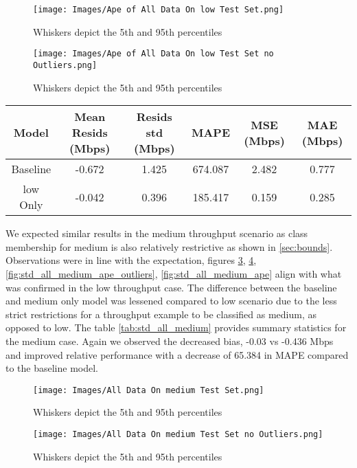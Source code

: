 \begin{figure}[h]
\texttt{[image: Images/Ape of All Data On low Test Set.png]}
\centering
\caption{Whiskers depict the 5th and 95th percentiles}
\label{fig:std_all_low_ape_outliers}
\end{figure}

\begin{figure}[h]
\texttt{[image: Images/Ape of All Data On low Test Set no Outliers.png]}
\centering
\caption{Whiskers depict the 5th and 95th percentiles}
\label{fig:std_all_low_ape}
\end{figure}

\begin{table}[h]
\centering
\begin{tabular}{|c|c|c|c|c|c|}
\hline
{Model} & {Mean Resids (Mbps)} & {Resids std (Mbps)} & {MAPE} & {MSE (Mbps)} & {MAE (Mbps)}\\
\hline
Baseline & -0.672 & 1.425 & 674.087 & 2.482 & 0.777\\
\hline
low Only & -0.042 & 0.396 & 185.417 & 0.159 & 0.285\\
\hline
\end{tabular}
\label{tab:std_all_low}
\end{table}

\newpage
We expected similar results in the medium throughput scenario as class membership for medium is also relatively restrictive as shown in \ref{sec:bounds}. Observations were in line with the expectation, figures \ref{fig:std_all_medium_resids_outliers}, \ref{fig:std_all_medium_resids}, \ref{fig:std_all_medium_ape_outliers}, \ref{fig:std_all_medium_ape} align with what was confirmed in the low throughput case. The difference between the baseline and medium only model was lessened compared to low scenario due to the less strict restrictions for a throughput example to be classified as medium, as opposed to low. The table \ref{tab:std_all_medium} provides summary statistics for the medium case. Again we observed the decreased bias, -0.03 vs -0.436 Mbps and improved relative performance with a decrease of 65.384 in MAPE compared to the baseline model.

\begin{figure}[h]
\texttt{[image: Images/All Data On medium Test Set.png]}
\centering
\caption{Whiskers depict the 5th and 95th percentiles}
\label{fig:std_all_medium_resids_outliers}
\end{figure}

\begin{figure}[h]
\texttt{[image: Images/All Data On medium Test Set no Outliers.png]}
\centering
\caption{Whiskers depict the 5th and 95th percentiles}
\label{fig:std_all_medium_resids}
\end{figure}

